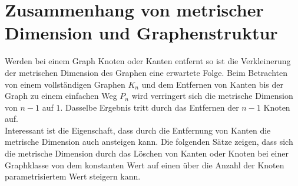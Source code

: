 \section{Zusammenhang von metrischer Dimension und Graphenstruktur}
Werden bei einem Graph Knoten oder Kanten entfernt so ist die Verkleinerung der metrischen Dimension des Graphen eine erwartete Folge. Beim Betrachten von einem vollständigen Graphen $K_n$ und dem Entfernen von Kanten bis der Graph zu einem einfachen Weg $P_n$ wird verringert sich die metrische Dimension von $n-1$ auf $1$. Dasselbe Ergebnis tritt durch das Entfernen der $n-1$ Knoten auf.\\Interessant ist die Eigenschaft, dass durch die Entfernung von Kanten die metrische Dimension auch ansteigen kann. Die folgenden Sätze zeigen, dass sich die metrische Dimension durch das Löschen von Kanten oder Knoten bei einer Graphklasse von dem konstanten Wert auf einen über die Anzahl der Knoten parametrisiertem Wert steigern kann.
